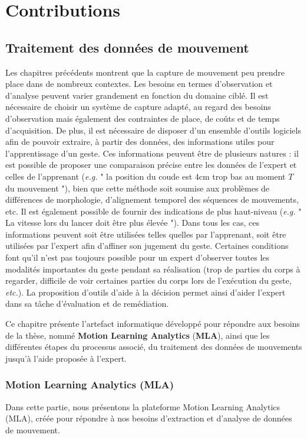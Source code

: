 \part{Contributions}

\chapter{Traitement des données de mouvement}\label{chap:traitement_donnees}
Les chapitres précédents montrent que la capture de mouvement peu prendre place dans de nombreux contextes. Les besoins en termes d'observation et d'analyse peuvent varier grandement en fonction du domaine ciblé. Il est nécessaire de choisir un système de capture adapté, au regard des besoins d'observation mais également des contraintes de place, de coûts et de temps d'acquisition. De plus, il est nécessaire de disposer d'un ensemble d'outils logiciels afin de pouvoir extraire, à partir des données, des informations utiles pour l'apprentissage d'un geste. Ces informations peuvent être de plusieurs natures : il est possible de proposer une comparaison précise entre les données de l'expert et celles de l'apprenant (\textit{e.g.} " la position du coude est 4cm trop bas au moment $T$ du mouvement "), bien que cette méthode soit soumise aux problèmes de différences de morphologie, d'alignement temporel des séquences de mouvements, etc. Il est également possible de fournir des indications de plus haut-niveau (\textit{e.g.} " La vitesse lors du lancer doit être plus élevée "). Dans tous les cas, ces informations peuvent soit être utilisées telles quelles par l'apprenant, soit être utilisées par l'expert afin d'affiner son jugement du geste. Certaines conditions font qu'il n'est pas toujours possible pour un expert d'observer toutes les modalités importantes du geste pendant sa réalisation (trop de parties du corps à regarder, difficile de voir certaines parties du corps lors de l'exécution du geste, \textit{etc.}). La proposition d'outils d'aide à la décision permet ainsi d'aider l'expert dans sa tâche d'évaluation et de remédiation.

Ce chapitre présente l'artefact informatique développé pour répondre aux besoins de la thèse, nommé \textbf{Motion Learning Analytics} (\textbf{MLA}), ainsi que les différentes étapes du processus associé, du traitement des données de mouvements jusqu'à l'aide proposée à l'expert.

\section{Motion Learning Analytics (MLA)}
Dans cette partie, nous présentons la plateforme Motion Learning Analytics (MLA), créée pour répondre à nos besoins d'extraction et d'analyse de données de mouvement.


